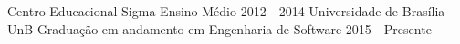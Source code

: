 \begin{cventries}
    \cventry
        {Centro Educacional Sigma}
        {Ensino Médio}
        {}
        {2012 - 2014}
        {}
  \cventry
    {Universidade de Brasília - UnB}
    {Graduação em andamento em Engenharia de Software}
    {}
    {2015 - Presente}
    {}
\end{cventries}
